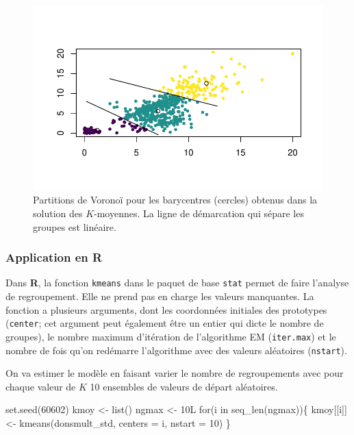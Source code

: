 \documentclass[
  11pt,
  letterpaper,
]{scrbook}
\newenvironment{Shaded}{\begin{snugshade}}{\end{snugshade}}
\newcommand{\AttributeTok}[1]{\textcolor[rgb]{0.40,0.45,0.13}{#1}}
\newcommand{\ControlFlowTok}[1]{\textcolor[rgb]{0.00,0.23,0.31}{#1}}
\newcommand{\DecValTok}[1]{\textcolor[rgb]{0.68,0.00,0.00}{#1}}
\newcommand{\FunctionTok}[1]{\textcolor[rgb]{0.28,0.35,0.67}{#1}}
\newcommand{\NormalTok}[1]{\textcolor[rgb]{0.00,0.23,0.31}{#1}}
\newcommand{\OtherTok}[1]{\textcolor[rgb]{0.00,0.23,0.31}{#1}}
\theoremstyle{definition}
\theoremstyle{remark}
\begin{document}
\begin{figure}[ht!]

{\centering \includegraphics{regroupements_files/figure-pdf/fig-voronoikmoy-1.pdf}

}

\caption{\label{fig-voronoikmoy}Partitions de Voronoï pour les
barycentres (cercles) obtenus dans la solution des \(K\)-moyennes. La
ligne de démarcation qui sépare les groupes est linéaire.}

\end{figure}

\hypertarget{application-en-r}{%
\subsubsection{\texorpdfstring{Application en
\textbf{R}}{Application en R}}\label{application-en-r}}

Dans \textbf{R}, la fonction \texttt{kmeans} dans le paquet de base
\texttt{stat} permet de faire l'analyse de regroupement. Elle ne prend
pas en charge les valeurs manquantes. La fonction a plusieurs arguments,
dont les coordonnées initiales des prototypes (\texttt{center}; cet
argument peut également être un entier qui dicte le nombre de groupes),
le nombre maximum d'itération de l'algorithme EM (\texttt{iter.max}) et
le nombre de fois qu'on redémarre l'algorithme avec des valeurs
aléatoires (\texttt{nstart}).

On va estimer le modèle en faisant varier le nombre de regroupements
avec pour chaque valeur de \(K\) 10 ensembles de valeurs de départ
aléatoires.

\begin{Shaded}
\begin{Highlighting}[]
\FunctionTok{set.seed}\NormalTok{(}\DecValTok{60602}\NormalTok{)}
\NormalTok{kmoy }\OtherTok{\textless{}{-}} \FunctionTok{list}\NormalTok{()}
\NormalTok{ngmax }\OtherTok{\textless{}{-}}\NormalTok{ 10L}
\ControlFlowTok{for}\NormalTok{(i }\ControlFlowTok{in} \FunctionTok{seq\_len}\NormalTok{(ngmax))\{}
\NormalTok{ kmoy[[i]] }\OtherTok{\textless{}{-}} \FunctionTok{kmeans}\NormalTok{(donsmult\_std,}
                     \AttributeTok{centers =}\NormalTok{ i,}
                     \AttributeTok{nstart =} \DecValTok{10}\NormalTok{)}
\NormalTok{\}}
\end{Highlighting}
\end{Shaded}
\end{document}
